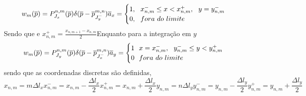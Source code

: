 \documentclass[
	12pt,				%
	openright,			%
	oneside,			%
	a4papey79r,			%
	english,			%
	brazil				%
	]{abntex2}
\begin{document}
 \begin{equation}{\label{FunçaoTesteJx}}
     w_{m}(\overline{p})= P_{J_x}^{n,m}(\overline{p})\delta(\overline{p}-\overline{p}^{{m,n}}_{J^{-}_y})\overline{a}_x =
       \begin{cases}
      1, \ \ x_{n,m}^{-} \leq x < x_{n,m}^{+},\ \ y=y_{n,m}^{-}\\
      0, \ \ fora \ do \ limite \\
    \end{cases}  
 \end{equation}
Sendo que e  $x^{+}_{n,m}=\frac{x_{n,m+1}-x_{n,m}}{2}$Enquanto para a integração em $y$
\begin{equation}{\label{FunçaoTesteJx}}
     w_{m}(\overline{p})= P_{J_y}^{n,m}(\overline{p})\delta(\overline{p}-\overline{p}^{{m,n}}_{J^{-}_x})\overline{a}_y =
       \begin{cases}
      1 \ \ x=x_{n,m}^{-}, \ \ y_{n,m}^{-} \leq y < y_{n,m}^{+}  \\
      0 \ \ fora \ do \ limite \\
    \end{cases}  
 \end{equation}
sendo que as coordenadas discretas são definidas, 
 \begin{subequations}
    \begin{equation}
    x_{n,m}=m{\Delta l}_x
\end{equation}
    \begin{equation}
    x^{-}_{n,m}=x_{n,m}-\frac{{\Delta l}_x}{2}
\end{equation}
  \begin{equation}
    x^{+}_{n,m}=x_{n,m}+\frac{{\Delta l}_x}{2}
\end{equation}
      \begin{equation}
    y_{n,m}=n{\Delta l}_y
\end{equation}
  \begin{equation}
    y^{-}_{n,m}=y_{n,m}-\frac{{\Delta l}_y}{2}
\end{equation}
  \begin{equation}
    y^{+}_{n,m}=y_{n,m}+\frac{{\Delta l}_y}{2}
\end{equation}
\end{subequations}
\end{document}
